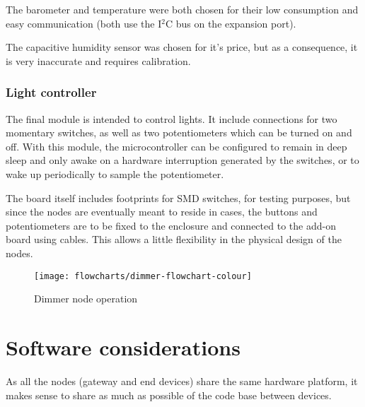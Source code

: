 The barometer and temperature were both chosen for their low consumption and
easy communication (both use the I$^{2}$C bus on the expansion port).

The capacitive humidity sensor was chosen for it's price, but as a consequence,
it is very inaccurate and requires calibration.

\subsubsection{Light controller}

The final module is intended to control lights. It include connections for two
momentary switches, as well as two potentiometers which can be turned on and
off. With this module, the microcontroller can be configured to remain in deep
sleep and only awake on a hardware interruption generated by the switches, or to
wake up periodically to sample the potentiometer.

The board itself includes footprints for SMD switches, for testing purposes, but
since the nodes are eventually meant to reside in cases, the buttons and
potentiometers are to be fixed to the enclosure and connected to the add-on
board using cables. This allows a little flexibility in the physical design of
the nodes.

\begin{figure}[!h]
  \begin{center}
    \texttt{[image: flowcharts/dimmer-flowchart-colour]}
  \end{center}
  \caption{Dimmer node operation}
  \label{fig:dimmer-flowchart}
\end{figure}





\section{Software considerations}

As all the nodes (gateway and end devices) share the same hardware platform, it
makes sense to share as much as possible of the code base between devices.

